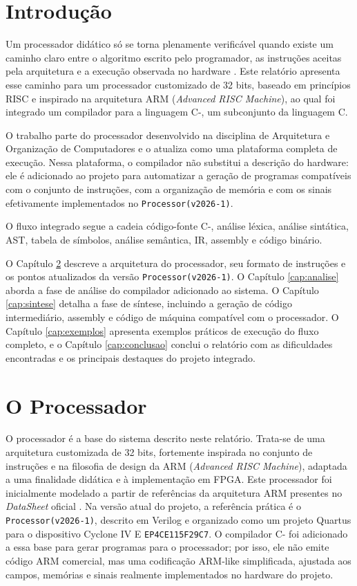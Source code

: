 \documentclass[
	12pt,				%
	oneside,
	a4paper,			%
	english,			%
	french,				%
	spanish,			%
	brazil,				%
	]{abntex2}
\begin{document}
\chapter{Introdução}

Um processador didático só se torna plenamente verificável quando existe um caminho claro entre o algoritmo escrito pelo programador, as instruções aceitas pela arquitetura e a execução observada no hardware \cite{patterson2017,compOrgDes}. Este relatório apresenta esse caminho para um processador customizado de 32 bits, baseado em princípios RISC e inspirado na arquitetura ARM (\emph{Advanced RISC Machine}), ao qual foi integrado um compilador para a linguagem C-, um subconjunto da linguagem C.

O trabalho parte do processador desenvolvido na disciplina de Arquitetura e Organização de Computadores e o atualiza como uma plataforma completa de execução. Nessa plataforma, o compilador não substitui a descrição do hardware: ele é adicionado ao projeto para automatizar a geração de programas compatíveis com o conjunto de instruções, com a organização de memória e com os sinais efetivamente implementados no \texttt{Processor(v2026-1)}.

O fluxo integrado segue a cadeia código-fonte C-, análise léxica, análise sintática, AST, tabela de símbolos, análise semântica, IR, assembly e código binário.

O Capítulo \ref{cap:processador} descreve a arquitetura do processador, seu formato de instruções e os pontos atualizados da versão \texttt{Processor(v2026-1)}. O Capítulo \ref{cap:analise} aborda a fase de análise do compilador adicionado ao sistema. O Capítulo \ref{cap:sintese} detalha a fase de síntese, incluindo a geração de código intermediário, assembly e código de máquina compatível com o processador. O Capítulo \ref{cap:exemplos} apresenta exemplos práticos de execução do fluxo completo, e o Capítulo \ref{cap:conclusao} conclui o relatório com as dificuldades encontradas e os principais destaques do projeto integrado.

\chapter{O Processador}
\label{cap:processador}
O processador é a base do sistema descrito neste relatório. Trata-se de uma arquitetura customizada de 32 bits, fortemente inspirada no conjunto de instruções e na filosofia de design da ARM (\emph{Advanced RISC Machine}), adaptada a uma finalidade didática e à implementação em FPGA. Este processador foi inicialmente modelado a partir de referências da arquitetura ARM presentes no \emph{DataSheet} oficial \cite{ARM_Datasheet,ARMtechnical}. Na versão atual do projeto, a referência prática é o \texttt{Processor(v2026-1)}, descrito em Verilog e organizado como um projeto Quartus para o dispositivo Cyclone IV E \texttt{EP4CE115F29C7}. O compilador C- foi adicionado a essa base para gerar programas para o processador; por isso, ele não emite código ARM comercial, mas uma codificação ARM-like simplificada, ajustada aos campos, memórias e sinais realmente implementados no hardware do projeto.
\end{document}
